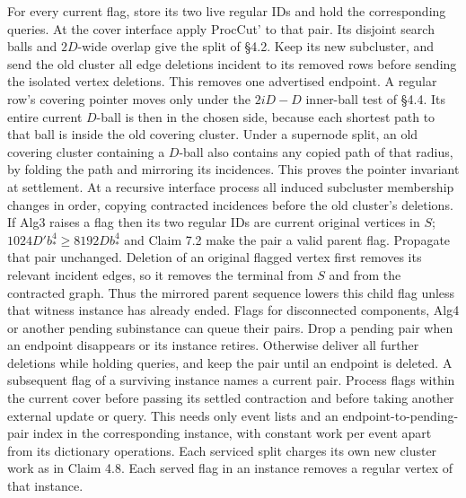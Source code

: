 \documentclass[11pt]{article}
\begin{document}
For every current flag, store its two live regular IDs and hold the corresponding queries. At the cover interface apply ProcCut' to that pair. Its disjoint search balls and \(2D\)-wide overlap give the split of §4.2. Keep its new subcluster, and send the old cluster all edge deletions incident to its removed rows before sending the isolated vertex deletions. This removes one advertised endpoint. A regular row's covering pointer moves only under the \(2iD-D\) inner-ball test of §4.4. Its entire current \(D\)-ball is then in the chosen side, because each shortest path to that ball is inside the old covering cluster. Under a supernode split, an old covering cluster containing a \(D\)-ball also contains any copied path of that radius, by folding the path and mirroring its incidences. This proves the pointer invariant at settlement. At a recursive interface process all induced subcluster membership changes in order, copying contracted incidences before the old cluster's deletions. If Alg3 raises a flag then its two regular IDs are current original vertices in \(S\); \(1024D' b_*^4\ge 8192D b_*^4\) and Claim 7.2 make the pair a valid parent flag. Propagate that pair unchanged. Deletion of an original flagged vertex first removes its relevant incident edges, so it removes the terminal from \(S\) and from the contracted graph. Thus the mirrored parent sequence lowers this child flag unless that witness instance has already ended. Flags for disconnected components, Alg4 or another pending subinstance can queue their pairs. Drop a pending pair when an endpoint disappears or its instance retires. Otherwise deliver all further deletions while holding queries, and keep the pair until an endpoint is deleted. A subsequent flag of a surviving instance names a current pair. Process flags within the current cover before passing its settled contraction and before taking another external update or query. This needs only event lists and an endpoint-to-pending-pair index in the corresponding instance, with constant work per event apart from its dictionary operations. Each serviced split charges its own new cluster work as in Claim 4.8. Each served flag in an instance removes a regular vertex of that instance.
\end{document}
